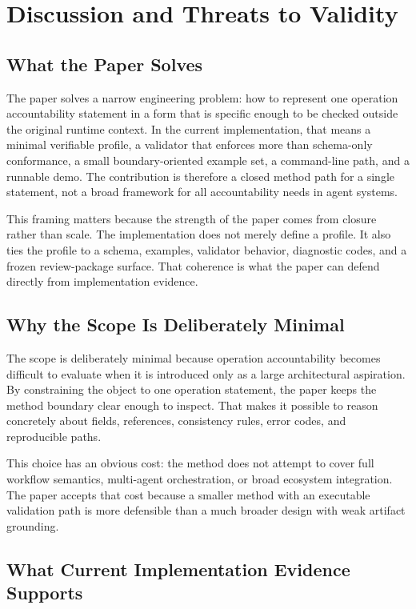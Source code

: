 \section{Discussion and Threats to Validity}

\subsection{What the Paper Solves}

The paper solves a narrow engineering problem: how to represent one operation accountability statement in a form that is specific enough to be checked outside the original runtime context. In the current implementation, that means a minimal verifiable profile, a validator that enforces more than schema-only conformance, a small boundary-oriented example set, a command-line path, and a runnable demo. The contribution is therefore a closed method path for a single statement, not a broad framework for all accountability needs in agent systems.

This framing matters because the strength of the paper comes from closure rather than scale. The implementation does not merely define a profile. It also ties the profile to a schema, examples, validator behavior, diagnostic codes, and a frozen review-package surface. That coherence is what the paper can defend directly from implementation evidence.

\subsection{Why the Scope Is Deliberately Minimal}

The scope is deliberately minimal because operation accountability becomes difficult to evaluate when it is introduced only as a large architectural aspiration. By constraining the object to one operation statement, the paper keeps the method boundary clear enough to inspect. That makes it possible to reason concretely about fields, references, consistency rules, error codes, and reproducible paths.

This choice has an obvious cost: the method does not attempt to cover full workflow semantics, multi-agent orchestration, or broad ecosystem integration. The paper accepts that cost because a smaller method with an executable validation path is more defensible than a much broader design with weak artifact grounding.

\subsection{What Current Implementation Evidence Supports}

